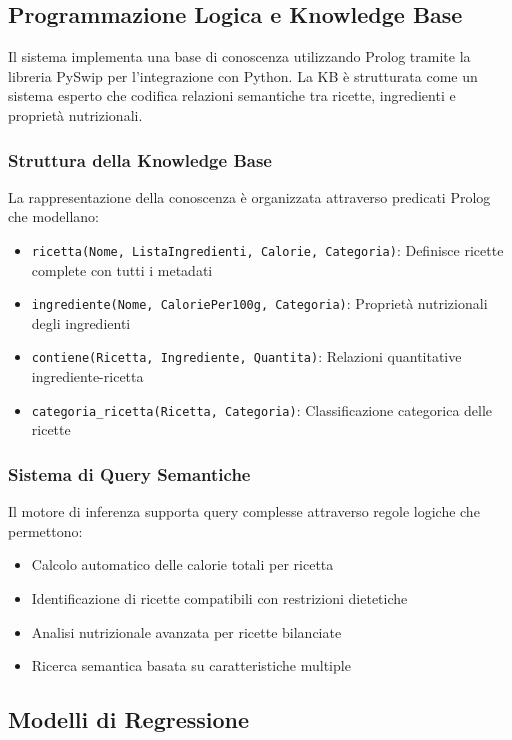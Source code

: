 \documentclass[12pt,a4paper]{article}
\begin{document}
\subsection{Programmazione Logica e Knowledge Base}

Il sistema implementa una base di conoscenza utilizzando Prolog tramite la libreria PySwip per l'integrazione con Python. La KB è strutturata come un sistema esperto che codifica relazioni semantiche tra ricette, ingredienti e proprietà nutrizionali.

\subsubsection{Struttura della Knowledge Base}

La rappresentazione della conoscenza è organizzata attraverso predicati Prolog che modellano:
\begin{itemize}
    \item \texttt{ricetta(Nome, ListaIngredienti, Calorie, Categoria)}: Definisce ricette complete con tutti i metadati
    \item \texttt{ingrediente(Nome, CaloriePer100g, Categoria)}: Proprietà nutrizionali degli ingredienti
    \item \texttt{contiene(Ricetta, Ingrediente, Quantita)}: Relazioni quantitative ingrediente-ricetta
    \item \texttt{categoria\_ricetta(Ricetta, Categoria)}: Classificazione categorica delle ricette
\end{itemize}

\subsubsection{Sistema di Query Semantiche}

Il motore di inferenza supporta query complesse attraverso regole logiche che permettono:
\begin{itemize}
    \item Calcolo automatico delle calorie totali per ricetta
    \item Identificazione di ricette compatibili con restrizioni dietetiche
    \item Analisi nutrizionale avanzata per ricette bilanciate
    \item Ricerca semantica basata su caratteristiche multiple
\end{itemize}

\subsection{Modelli di Regressione}
\end{document}
